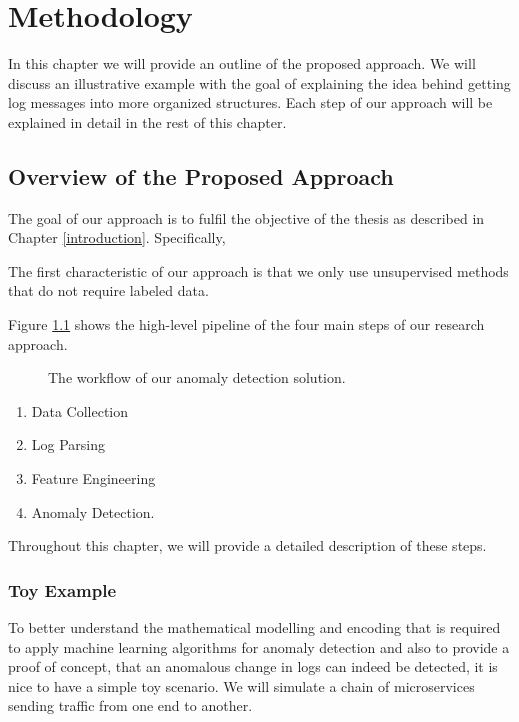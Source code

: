 \chapter{Methodology}
\label{methodology}

In this chapter we will provide an outline of the proposed approach. We will discuss an illustrative example with the goal of explaining the idea behind getting log messages into more organized structures. Each step of our approach will be explained in detail in the rest of this chapter.


\section{Overview of the Proposed Approach}
The goal of our approach is to fulfil the objective of the thesis as described in Chapter \ref{introduction}. Specifically, 

The first characteristic of our approach is that we only use unsupervised methods that do not require labeled data. 

Figure \ref{fig:worklowOverview} shows the high-level pipeline of the four main steps of our research approach.

\begin{figure}[h]
    \centering
    
    \caption{The workflow of our anomaly detection solution.}
    \label{fig:worklowOverview}
\end{figure}

\begin{enumerate}
    \item Data Collection 
    \item Log Parsing
    \item Feature Engineering
    \item Anomaly Detection.
\end{enumerate}

Throughout this chapter, we will provide a detailed description of these steps.


\subsection{Toy Example}
To better understand the mathematical modelling and encoding that is required to apply machine learning algorithms for anomaly detection and also to provide a proof of concept, that an anomalous change in logs can indeed be detected, it is nice to have a simple toy scenario. We will simulate a chain of microservices sending traffic from one end to another.

